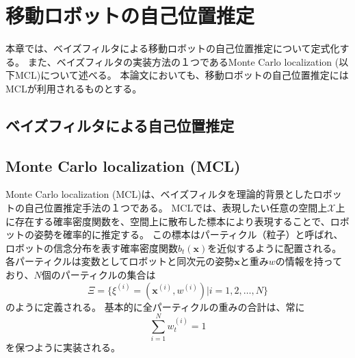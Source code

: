 \chapter{移動ロボットの自己位置推定} \label{chapter:localization}

本章では、ベイズフィルタによる移動ロボットの自己位置推定について定式化する。
また、ベイズフィルタの実装方法の１つであるMonte Carlo localization (以下MCL)について述べる。
本論文においても、移動ロボットの自己位置推定にはMCLが利用されるものとする。



\section{ベイズフィルタによる自己位置推定}




\section{Monte Carlo localization (MCL)}

Monte Carlo localization (MCL)は、ベイズフィルタを理論的背景としたロボットの自己位置推定手法の１つである。
MCLでは、表現したい任意の空間上$\mathcal{X}$上に存在する確率密度関数を、空間上に散布した標本により表現することで、ロボットの姿勢を確率的に推定する。
この標本はパーティクル（粒子）と呼ばれ、ロボットの信念分布を表す確率密度関数$b_t(\bm{x})$を近似するように配置される。
各パーティクルは変数としてロボットと同次元の姿勢$\bm{x}$と重み$w$の情報を持っており、$N$個のパーティクルの集合は
\begin{equation}
\label{particles}
  \Xi = \{ \xi^{(i)} = (\bm{x}^{(i)}, w^{(i)}) |i = 1,2,\dots,N \}
\end{equation}
のように定義される。
基本的に全パーティクルの重みの合計は、常に
\begin{equation}
\label{weight_sum}
  \sum_{i=1}^{N}w^{(i)}_{t}=1
\end{equation}
を保つように実装される。

